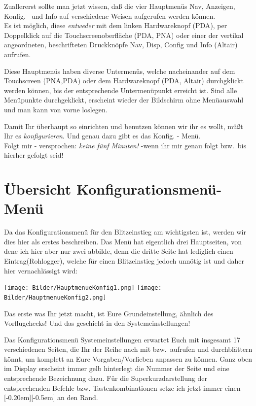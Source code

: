 Zuallererst sollte man jetzt wissen, daß die vier Hauptmenüs \textsf{Nav}, \textsf{Anzeigen}, \textsf{Konfig.\ } und \textsf{Info} auf verschiedene Weisen aufgerufen werden können.\\

Es ist möglich, diese  \textsl{entweder }mit dem linken Hardwareknopf (\textsf{PDA}), per Doppelklick auf die Touchscreenoberfläche (\textsf{\textsf{PDA, PNA}}) oder einer der vertikal angeordneten, beschrifteten Druckknöpfe \textsf{Nav}, \textsf{Disp}, \textsf{Config} und \textsf{Info} (\textsf{Altair}) aufrufen.

Diese Hauptmenüs haben diverse Untermenüs, welche nacheinander auf dem Touchscreen
(\textsf{PNA,PDA}) oder dem Hardwareknopf (\textsf{PDA, Altair}) durchgklickt werden
können, bis der entsprechende Untermenüpunkt erreicht ist. Sind alle Menüpunkte
durchgeklickt, erscheint wieder der Bildschirm ohne Menüauswahl und man kann von
vorne loslegen.

Damit Ihr  \xc  überhaupt so einrichten und benutzen können wir ihr es wollt, müßt Ihr es \textsl{konfigurieren}. Und genau dazu gibt es das \textsf{Konfig.} - Menü.\\[1em]

Folgt mir -  versprochen:  \textsl{keine fünf Minuten!} -wenn ihr mir genau folgt bzw.\ bis hierher gefolgt seid!
%
\section{Übersicht Konfigurationsmenü-Menü}\label{Blitz-Konfig}
Da das Konfigurationsmenü für den Blitzeinstieg am wichtigsten ist, werden wir dies hier als erstes beschreiben. Das Menü hat eigentlich drei Hauptseiten, von dene ich hier aber nur zwei abbilde, denn die dritte Seite hat lediglich einen Eintrag(\textsf{Rohlogger}), welche für einen Blitzeinstieg jedoch unnötig ist und daher hier vernachlässigt wird:
\begin{center}
\texttt{[image: Bilder/HauptmenueKonfig1.png]}%
\qquad\qquad\texttt{[image: Bilder/HauptmenueKonfig2.png]}
\end{center}

Das erste was Ihr jetzt macht, ist Eure Grundeinstellung, ähnlich des Vorflugchecks! Und das geschieht in den \textsf{Systemeinstellungen}!

Das Konfigurationsmenü \textsf{ Systemeinstellungen} erwartet Euch mit insgesamt 17 verschiedenen Seiten, die Ihr der Reihe nach mit \fal bzw.\ \far aufrufen und durchblättern könnt, um  \xc komplett an Eure Vorgaben/Vorlieben anpassen zu können. Ganz oben im Display erscheint immer gelb hinterlegt die Nummer der Seite und eine entsprechende Bezeichnung dazu. Für die Superkurzdarstellung der entsprechenden Befehle bzw. Tastenkombinationen setze ich jetzt immer einen \raisebox{0mm}[-0.20em][-0.5em]{\smallblitz} an den Rand.\\

